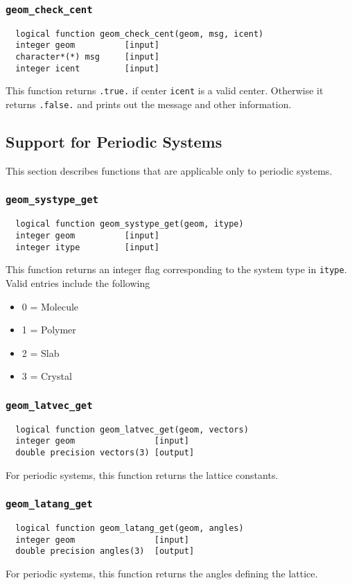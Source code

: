 \subsubsection{{\tt geom\_check\_cent}}
\begin{verbatim}
  logical function geom_check_cent(geom, msg, icent)
  integer geom          [input]
  character*(*) msg     [input]
  integer icent         [input]
\end{verbatim}
This function returns \verb+.true.+ if center \verb+icent+ is a valid center.
Otherwise it returns \verb+.false.+ and prints out the message and other
information. 

\subsection{Support for Periodic Systems}


This section describes functions that are applicable only to periodic systems.

\subsubsection{{\tt geom\_systype\_get}}
\begin{verbatim}
  logical function geom_systype_get(geom, itype)
  integer geom          [input]
  integer itype         [input]
\end{verbatim}
This function returns an integer flag corresponding to
the system type in {\tt itype}.  Valid entries include
the following
\begin{itemize}
\item 0 = Molecule
\item 1 = Polymer
\item 2 = Slab
\item 3 = Crystal
\end{itemize}

\subsubsection{{\tt geom\_latvec\_get}}
\begin{verbatim}
  logical function geom_latvec_get(geom, vectors)
  integer geom                [input]
  double precision vectors(3) [output]
\end{verbatim}
For periodic systems, this function returns the lattice constants.

\subsubsection{{\tt geom\_latang\_get}}
\begin{verbatim}
  logical function geom_latang_get(geom, angles)
  integer geom                [input]
  double precision angles(3)  [output]
\end{verbatim}
For periodic systems, this function returns the angles defining the lattice.

